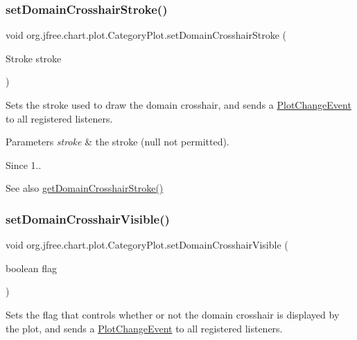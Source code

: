 \subsubsection{\texorpdfstring{set\+Domain\+Crosshair\+Stroke()}{setDomainCrosshairStroke()}}
{\footnotesize\ttfamily void org.\+jfree.\+chart.\+plot.\+Category\+Plot.\+set\+Domain\+Crosshair\+Stroke (\begin{DoxyParamCaption}\item[{Stroke}]{stroke }\end{DoxyParamCaption})}

Sets the stroke used to draw the domain crosshair, and sends a \mbox{\hyperlink{}{Plot\+Change\+Event}} to all registered listeners.


\begin{DoxyParams}{Parameters}
{\em stroke} & the stroke ({\ttfamily null} not permitted).\\
\hline
\end{DoxyParams}
\begin{DoxySince}{Since}
1..
\end{DoxySince}
\begin{DoxySeeAlso}{See also}
\mbox{\hyperlink{classorg_1_1jfree_1_1chart_1_1plot_1_1_category_plot_a87294a333f0a33da9ea7785774a7920f}{get\+Domain\+Crosshair\+Stroke()}} 
\end{DoxySeeAlso}
\mbox{\label{classorg_1_1jfree_1_1chart_1_1plot_1_1_category_plot_a2ab9eb722c31a8c3b1c179097cde043f}} 
\subsubsection{\texorpdfstring{set\+Domain\+Crosshair\+Visible()}{setDomainCrosshairVisible()}}
{\footnotesize\ttfamily void org.\+jfree.\+chart.\+plot.\+Category\+Plot.\+set\+Domain\+Crosshair\+Visible (\begin{DoxyParamCaption}\item[{boolean}]{flag }\end{DoxyParamCaption})}

Sets the flag that controls whether or not the domain crosshair is displayed by the plot, and sends a \mbox{\hyperlink{}{Plot\+Change\+Event}} to all registered listeners.


